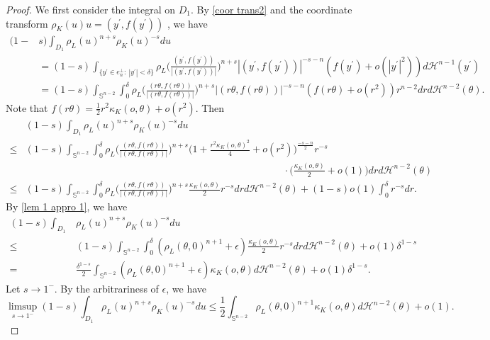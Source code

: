 \documentclass[10pt,a4paper]{amsart}
\newcommand{\tH}{\mathcal{H}}
\begin{document}
\begin{proof}
    We first consider the integral on $D_1$. By \eqref{coor trans2} and the coordinate transform $\rho_K(u)u=(y^{\prime}, f(y^{\prime}))$ , we have
    \begin{align*}
        (1-&s)\int_{D_1}\rho_L(u)^{n+s}\rho_K(u)^{-s}du\\
        &=(1-s)\int_{\{y^{\prime}\in e_n^{\perp}:~|y^{\prime}|<\delta\}}\rho_L\Big(\frac{(y^{\prime},f(y^{\prime}))}{|(y^{\prime},f(y^{\prime}))|}\Big)^{n+s}|(y^{\prime},f(y^{\prime}))|^{-s-n}(f(y^{\prime})+o(|y^{\prime}|^2))d\tH^{n-1}(y^{\prime})\\
        &=(1-s)\int_{\mathbb S^{n-2}}\int_0^{\delta}\rho_L\Big(\frac{(r\theta,f(r\theta))}{|(r\theta,f(r\theta))|}\Big)^{n+s}|(r\theta,f(r\theta))|^{-s-n}(f(r\theta)+o(r^2))r^{n-2}drd\tH^{n-2}(\theta).
    \end{align*}
    Note that $f(r\theta)=\frac{1}{2}r^2\kappa_K(o,\theta)+o(r^2)$. Then
    \begin{align*}
        &(1-s)\int_{D_1}\rho_L(u)^{n+s}\rho_K(u)^{-s}du\\
        \leq &(1-s)\int_{\mathbb S^{n-2}}\int_0^{\delta} \rho_L\Big(\frac{(r\theta,f(r\theta))}{|(r\theta,f(r\theta))|}\Big)^{n+s}\Big(1+\frac{r^2\kappa_K(o,\theta)^2}{4}+o(r^2)\Big)^{\frac{-s-n}{2}}r^{-s}\\ 
        & \quad\quad\quad\quad\quad\quad\quad\quad\quad\quad\quad\quad\quad\quad\quad\quad\quad\quad\quad\quad\quad\quad\quad\quad\quad\quad\cdot\Big(\frac{\kappa_K(o,\theta)}{2}+o(1)\Big)drd\tH^{n-2}(\theta)\\
        \leq &(1-s)\int_{\mathbb S^{n-2}}\int_0^{\delta}\rho_L\Big(\frac{(r\theta,f(r\theta))}{|(r\theta,f(r\theta))|}\Big)^{n+s}\frac{\kappa_K(o,\theta)}{2}r^{-s}drd\tH^{n-2}(\theta)+(1-s)o(1)\int
        _0^{\delta}r^{-s}dr.
    \end{align*}
    By \eqref{lem 1 appro 1}, we have
    \begin{align*}
        (1-s)\int_{D_1}&\rho_L(u)^{n+s}\rho_K(u)^{-s}du\\
        \leq &(1-s)\int_{\mathbb S^{n-2}}\int_0^{\delta}(\rho_L(\theta,0)^{n+1}+\epsilon)\frac{\kappa_K(o,\theta)}{2}r^{-s}drd\tH^{n-2}(\theta)+o(1)\delta^{1-s}\\
        =&\frac{\delta^{1-s}}{2}\int_{\mathbb S^{n-2}}(\rho_L(\theta,0)^{n+1}+\epsilon)\kappa_K(o,\theta)d\tH^{n-2}(\theta)+o(1)\delta^{1-s}.
    \end{align*}
    Let $s\rightarrow 1^{-}$. By the arbitrariness of $\epsilon$, we have
    \[\limsup_{s\rightarrow1^-}(1-s)\int_{D_1}\rho_L(u)^{n+s}\rho_K(u)^{-s}du\leq \frac{1}{2}\int_{\mathbb S^{n-2}}\rho_L(\theta,0)^{n+1}\kappa_K(o,\theta)d\tH^{n-2}(\theta)+o(1).\]


\end{proof}
\end{document}
